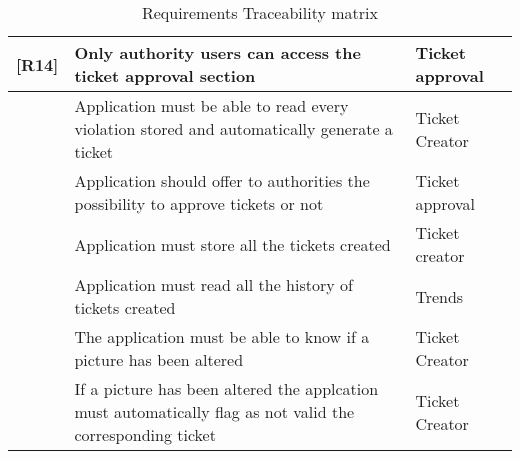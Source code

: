 \begin{table}[H]
\begin {centering}
\begin{tabular}{|l|p{10cm}|p{5cm}|}
[R14] & Only authority users can access the ticket approval section & Ticket approval \\ \hline %
[R15] & Application must be able to read every violation stored and automatically generate a ticket & Ticket Creator\\ \hline %
[R16] & Application should offer to authorities the possibility to approve tickets or not & Ticket approval \\ \hline %
[R17] & Application must store all the tickets created & Ticket creator \\ \hline %
[R18] & Application must read all the history of tickets created & Trends \\ \hline %
[R19] & The application must be able to know if a picture has been altered & Ticket Creator \\ \hline %
[R20] & If a picture has been altered the applcation must automatically flag as not valid the corresponding ticket & Ticket Creator \\ \hline %
\end{tabular}
\end{centering}
\caption{Requirements Traceability matrix}
		\label{Traceabilitymatrix}
\end{table}
